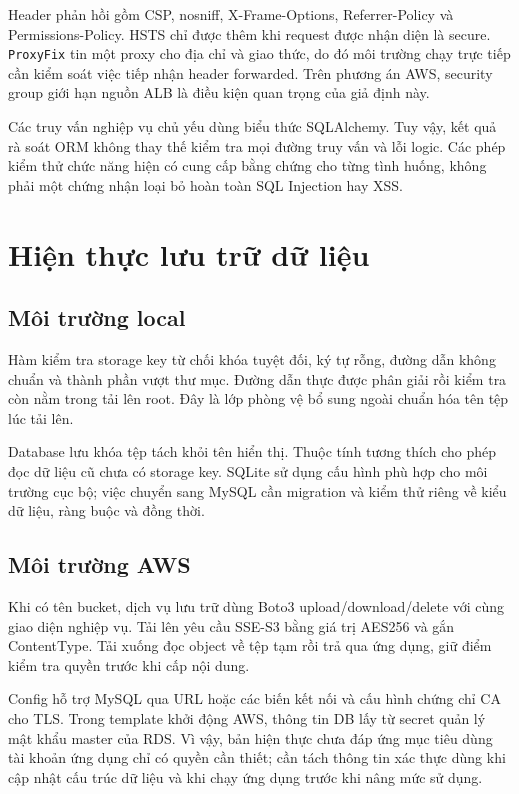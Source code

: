 Header phản hồi gồm CSP, nosniff, X-Frame-Options, Referrer-Policy và Permissions-Policy. HSTS chỉ được thêm khi request được nhận diện là secure. \texttt{ProxyFix} tin một proxy cho địa chỉ và giao thức, do đó môi trường chạy trực tiếp cần kiểm soát việc tiếp nhận header forwarded. Trên phương án AWS, security group giới hạn nguồn ALB là điều kiện quan trọng của giả định này.

Các truy vấn nghiệp vụ chủ yếu dùng biểu thức SQLAlchemy. Tuy vậy, kết quả rà soát ORM không thay thế kiểm tra mọi đường truy vấn và lỗi logic. Các phép kiểm thử chức năng hiện có cung cấp bằng chứng cho từng tình huống, không phải một chứng nhận loại bỏ hoàn toàn SQL Injection hay XSS.

\section{Hiện thực lưu trữ dữ liệu}
\subsection{Môi trường local}
Hàm kiểm tra storage key từ chối khóa tuyệt đối, ký tự rỗng, đường dẫn không chuẩn và thành phần vượt thư mục. Đường dẫn thực được phân giải rồi kiểm tra còn nằm trong tải lên root. Đây là lớp phòng vệ bổ sung ngoài chuẩn hóa tên tệp lúc tải lên.

Database lưu khóa tệp tách khỏi tên hiển thị. Thuộc tính tương thích cho phép đọc dữ liệu cũ chưa có storage key. SQLite sử dụng cấu hình phù hợp cho môi trường cục bộ; việc chuyển sang MySQL cần migration và kiểm thử riêng về kiểu dữ liệu, ràng buộc và đồng thời.
\subsection{Môi trường AWS}
Khi có tên bucket, dịch vụ lưu trữ dùng Boto3 upload/download/delete với cùng giao diện nghiệp vụ. Tải lên yêu cầu SSE-S3 bằng giá trị AES256 và gắn ContentType. Tải xuống đọc object về tệp tạm rồi trả qua ứng dụng, giữ điểm kiểm tra quyền trước khi cấp nội dung.

Config hỗ trợ MySQL qua URL hoặc các biến kết nối và cấu hình chứng chỉ CA cho TLS. Trong template khởi động AWS, thông tin DB lấy từ secret quản lý mật khẩu master của RDS. Vì vậy, bản hiện thực chưa đáp ứng mục tiêu dùng tài khoản ứng dụng chỉ có quyền cần thiết; cần tách thông tin xác thực dùng khi cập nhật cấu trúc dữ liệu và khi chạy ứng dụng trước khi nâng mức sử dụng.

